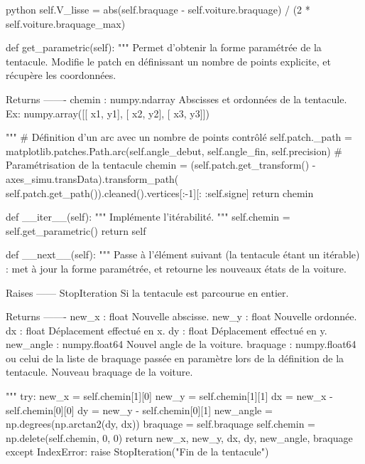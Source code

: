 \begin{mintedbox}{python}
        self.V_lisse = abs(self.braquage - self.voiture.braquage) / (2 * self.voiture.braquage_max)

    def get_parametric(self):
        """
        Permet d'obtenir la forme paramétrée de la tentacule. Modifie le patch en définissant un nombre de points explicite, et récupère les coordonnées.

        Returns
        -------
        chemin : numpy.ndarray
            Abscisses et ordonnées de la tentacule.
            Ex: numpy.array([[ x1,   y1],
                             [ x2,   y2],
                             [ x3,   y3]])

        """
        # Définition d'un arc avec un nombre de points contrôlé
        self.patch._path = matplotlib.patches.Path.arc(self.angle_debut, self.angle_fin, self.precision)
        # Paramétrisation de la tentacule
        chemin = (self.patch.get_transform() - axes_simu.transData).transform_path( self.patch.get_path()).cleaned().vertices[:-1][: :self.signe]
        return chemin

    def __iter__(self):
        """
        Implémente l'itérabilité.
        """
        self.chemin = self.get_parametric()
        return self

    def __next__(self):
        """
        Passe à l'élément suivant (la tentacule étant un itérable) : met à jour la forme paramétrée, et retourne les nouveaux états de la voiture.

        Raises
        ------
        StopIteration
            Si la tentacule est parcourue en entier.

        Returns
        -------
        new_x : float
            Nouvelle abscisse.
        new_y : float
            Nouvelle ordonnée.
        dx : float
            Déplacement effectué en x.
        dy : float
            Déplacement effectué en y.
        new_angle : numpy.float64
            Nouvel angle de la voiture.
        braquage : numpy.float64 ou celui de la liste de braquage passée en paramètre lors de la définition de la tentacule.
            Nouveau braquage de la voiture.

        """
        try:
            new_x = self.chemin[1][0]
            new_y = self.chemin[1][1]
            dx = new_x - self.chemin[0][0]
            dy = new_y - self.chemin[0][1]
            new_angle = np.degrees(np.arctan2(dy, dx))
            braquage = self.braquage
            self.chemin = np.delete(self.chemin, 0, 0)
            return new_x, new_y, dx, dy, new_angle, braquage
        except IndexError:
            raise StopIteration("Fin de la tentacule")



\end{mintedbox}

